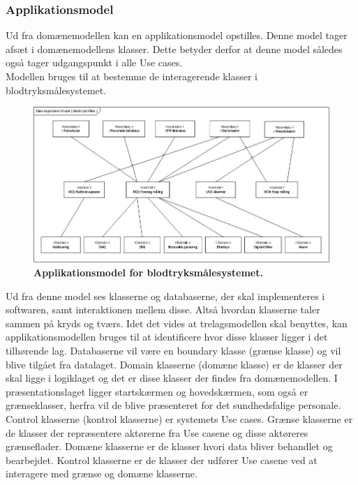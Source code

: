 \subsubsection{Applikationsmodel}
Ud fra domænemodellen kan en applikationsmodel opstilles. Denne model tager afsæt i domænemodellens klasser. Dette betyder derfor at denne model således også tager udgangspunkt i alle Use cases.\\
Modellen bruges til at bestemme de interagerende klasser i blodtryksmålesystemet.\\
\begin{figure}[H]
\includegraphics[width =1.0\textwidth , center]{billeder/appModel}
\caption{\textbf{Applikationsmodel for blodtryksmålesystemet.}}
\end{figure}
Ud fra denne model ses klasserne og databaserne, der skal implementeres i softwaren, samt interaktionen mellem disse. Altså hvordan klasserne taler sammen på kryds og tværs. Idet det vides at trelagsmodellen skal benyttes, kan applikationsmodellen bruges til at identificere hvor disse klasser ligger i det tilhørende lag. Databaserne vil være en boundary klasse (grænse klasse) og vil blive tilgået fra datalaget. Domain klasserne (domæne klasse) er de klasser der skal ligge i logiklaget og det er disse klasser der findes fra domænemodellen. I præsentationslaget ligger startskærmen og hovedskærmen, som også er grænseklasser, herfra vil de blive præsenteret for det sundhedsfalige personale. Control klasserne (kontrol klasserne) er systemets Use cases. Grænse klasserne er de klasser der repræsentere aktørerne fra Use casene og disse aktøreres grænseflader. Domæne klasserne er de klasser hvori data bliver behandlet og bearbejdet. Kontrol klasserne er de klasser der udfører Use casene ved at interagere med grænse og domæne klasserne. \\\\
